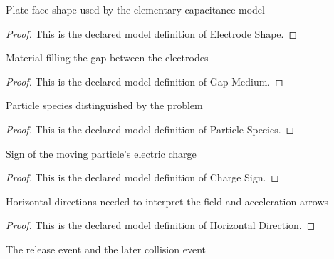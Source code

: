 \begin{definition}
  \label{def:physics:phyx-mini-0908:phyxminiproblems-problemphyxmini0908-electrodeshape}
  Plate-face shape used by the elementary capacitance model
\end{definition}
\begin{proof}
  This is the declared model definition of Electrode Shape.
\end{proof}
\begin{definition}
  \label{def:physics:phyx-mini-0908:phyxminiproblems-problemphyxmini0908-gapmedium}
  Material filling the gap between the electrodes
\end{definition}
\begin{proof}
  This is the declared model definition of Gap Medium.
\end{proof}
\begin{definition}
  \label{def:physics:phyx-mini-0908:phyxminiproblems-problemphyxmini0908-particlespecies}
  Particle species distinguished by the problem
\end{definition}
\begin{proof}
  This is the declared model definition of Particle Species.
\end{proof}
\begin{definition}
  \label{def:physics:phyx-mini-0908:phyxminiproblems-problemphyxmini0908-chargesign}
  Sign of the moving particle's electric charge
\end{definition}
\begin{proof}
  This is the declared model definition of Charge Sign.
\end{proof}
\begin{definition}
  \label{def:physics:phyx-mini-0908:phyxminiproblems-problemphyxmini0908-horizontaldirection}
  Horizontal directions needed to interpret the field and acceleration arrows
\end{definition}
\begin{proof}
  This is the declared model definition of Horizontal Direction.
\end{proof}
\begin{definition}
  \label{def:physics:phyx-mini-0908:phyxminiproblems-problemphyxmini0908-motionevent}
  The release event and the later collision event
\end{definition}
